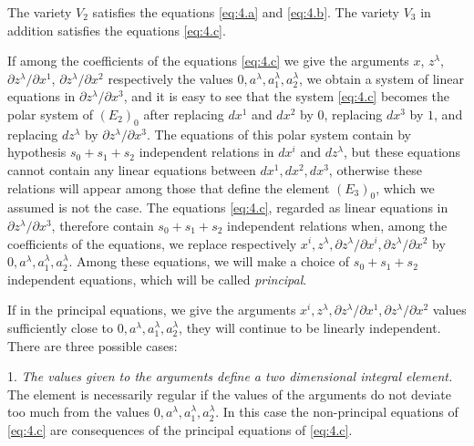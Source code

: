 \documentclass[leqno,11pt]{book}
\numberwithin{equation}{chapter}
\newcommand{\pd}{\partial}
\theoremstyle{shape1}
\theoremstyle{shape0}
\theoremstyle{shape2}
\theoremstyle{definition}
\begin{document}
The variety $V_{2}$ satisfies the equations \eqref{eq:4.a} and \eqref{eq:4.b}. The variety $V_{3}$ in addition satisfies the equations \eqref{eq:4.c}.

\vspace{12pt}\fsec If among the coefficients of the equations \eqref{eq:4.c} we give the arguments $x$, $z^{\lambda}$, $\pd z^{\lambda}/\pd x^{1}$, $\pd z^{\lambda}/\pd x^{2}$ respectively the values $0,a^{\lambda},a^{\lambda}_{1},a^{\lambda}_{2}$, we obtain a system of linear equations in $\pd z^{\lambda}/\pd x^{3}$, and it is easy to see that the system \eqref{eq:4.c} becomes the polar system of $(E_{2})_{0}$ after replacing $dx^{1}$ and $dx^{2}$ by $0$, replacing $dx^{3}$ by $1$, and replacing $dz^{\lambda}$ by $\pd z^{\lambda}/\pd x^{3}$. The equations of this polar system contain by hypothesis $s_{0}+s_{1}+s_{2}$ independent relations in $dx^{i}$ and $dz^{\lambda}$, but these equations cannot contain any linear equations between $dx^{1}, dx^{2}, dx^{3}$, otherwise these relations will appear among those that define the element $(E_{3})_{0}$, which we assumed is not the case. The equations \eqref{eq:4.c}, regarded as linear equations in $\pd z^{\lambda}/\pd x^{3}$, therefore contain $s_{0}+s_{1}+s_{2}$ independent relations when, among the coefficients of the equations, we replace respectively $x^{i},z^{\lambda}, \pd z^{\lambda}/\pd x^{i}, \pd z^{\lambda}/\pd x^{2}$ by $0,a^{\lambda},a_{1}^{\lambda},a_{2}^{\lambda}$. Among these equations, we will make a choice of $s_{0}+s_{1}+s_{2}$ independent equations, which will be called \emph{principal}.

If in the principal equations, we give the arguments $x^{i}, z^{\lambda}, \pd z^{\lambda}/\pd x^{1}, \pd z^{\lambda}/\pd x^{2}$  values sufficiently close to $0, a^{\lambda}, a_{1}^{\lambda}, a_{2}^{\lambda}$, they will continue to be linearly independent. There are three possible cases:
\vspace{12pt}

1. \emph{The values given to the arguments define a two dimensional integral element.} The element is necessarily regular if the values of the arguments do not deviate too much from the values $0, a^{\lambda}, a_{1}^{\lambda}, a_{2}^{\lambda}$. In this case the non-principal equations of \eqref{eq:4.c} are consequences of the principal equations of \eqref{eq:4.c}.
\vspace{12pt}
\end{document}
